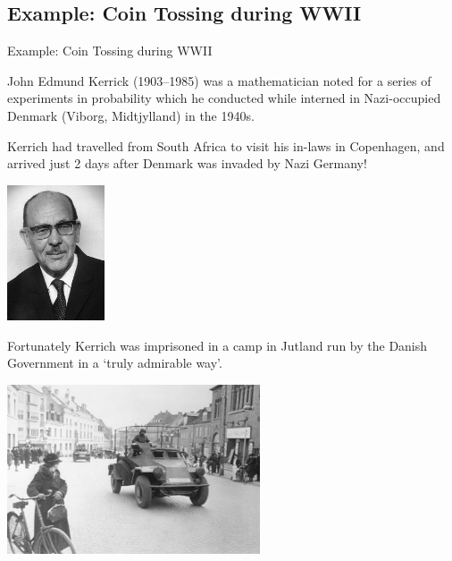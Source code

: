 \documentclass[t,xcolor=pdftex,dvipsnames,table]{beamer}\usepackage[]{graphicx}\usepackage[]{color}
\begin{document}
\subsection[]{Example: Coin Tossing during WWII}
\begin{frame}{Example: Coin Tossing during WWII}

John Edmund Kerrick (1903–1985) was a mathematician noted for a series of experiments in probability which he conducted while interned in Nazi-occupied Denmark (Viborg, Midtjylland) in the 1940s.  

\vspace{.5cm}
Kerrich had travelled from South Africa to visit his in-laws in Copenhagen, and arrived just 2 days after Denmark was invaded by Nazi Germany!

\begin{center}
\includegraphics[height=4cm]{../images/KerrichBig.jpg}
\end{center}
\end{frame}

\begin{frame}{}

Fortunately Kerrich was imprisoned in a camp in Jutland run by the Danish Government in a `truly admirable way'. \\

\begin{center}
\includegraphics[height=5cm]{../images/Jutland.jpg}
\end{center}
\end{frame}
\end{document}
